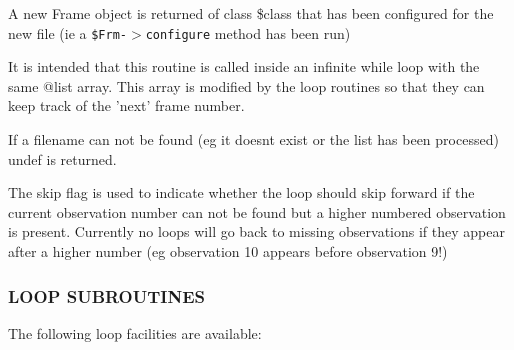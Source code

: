A new  Frame object is returned of class \$class that has been configured
for the new file (ie a \texttt{\$Frm-$>$configure} method has been run)



It is intended that this routine is called inside an infinite while
loop with the same @list array. This array is modified by the loop
routines so that they can keep track of the 'next' frame number.



If a filename can not be found (eg it doesnt exist or the list has
been processed) undef is returned.



The skip flag is used to indicate whether the loop should skip
forward if the current observation number can not be found
but a higher numbered observation is present. Currently no loops
will go back to missing observations if they appear after a higher
number (eg observation 10 appears before observation 9!)

\subsubsection*{LOOP SUBROUTINES\label{ORAC::Loop_LOOP_SUBROUTINES}}


The following loop facilities are available:


